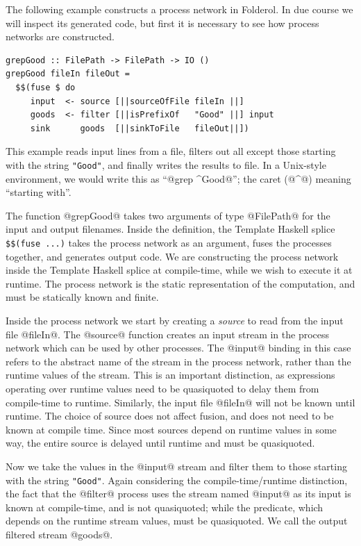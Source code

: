 The following example constructs a process network in Folderol.
In due course we will inspect its generated code, but first it is necessary to see how process networks are constructed.

\begin{lstlisting}
grepGood :: FilePath -> FilePath -> IO ()
grepGood fileIn fileOut =
  $$(fuse $ do
     input  <- source [||sourceOfFile fileIn ||]
     goods  <- filter [||isPrefixOf   "Good" ||] input
     sink      goods  [||sinkToFile   fileOut||])
\end{lstlisting}

This example reads input lines from a file, filters out all except those starting with the string \lstinline/"Good"/, and finally writes the results to file.
In a Unix-style environment, we would write this as ``@grep ^Good@''; the caret (@^@) meaning ``starting with''.

The function @grepGood@ takes two arguments of type @FilePath@ for the input and output filenames.
Inside the definition, the Template Haskell splice \lstinline/$$(fuse ...)/ takes the process network as an argument, fuses the processes together, and generates output code.
We are constructing the process network inside the Template Haskell splice at compile-time, while we wish to execute it at runtime.
The process network is the static representation of the computation, and must be statically known and finite.

Inside the process network we start by creating a \emph{source} to read from the input file @fileIn@.
The @source@ function creates an input stream in the process network which can be used by other processes.
The @input@ binding in this case refers to the abstract name of the stream in the process network, rather than the runtime values of the stream.
This is an important distinction, as expressions operating over runtime values need to be quasiquoted to delay them from compile-time to runtime.
Similarly, the input file @fileIn@ will not be known until runtime.
The choice of source does not affect fusion, and does not need to be known at compile time.
Since most sources depend on runtime values in some way, the entire source is delayed until runtime and must be quasiquoted.

Now we take the values in the @input@ stream and filter them to those starting with the string \lstinline/"Good"/.
Again considering the compile-time/runtime distinction, the fact that the @filter@ process uses the stream named @input@ as its input is known at compile-time, and is not quasiquoted; while the predicate, which depends on the runtime stream values, must be quasiquoted.
We call the output filtered stream @goods@.

